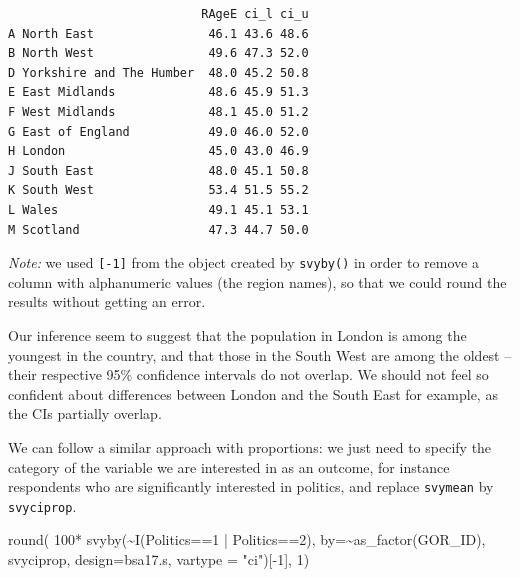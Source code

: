 \documentclass[
  14,
  a4paper,
  DIV=11,
  numbers=noendperiod]{scrartcl}
\newenvironment{Shaded}{\begin{snugshade}}{\end{snugshade}}
\newcommand{\AttributeTok}[1]{\textcolor[rgb]{0.40,0.45,0.13}{#1}}
\newcommand{\DecValTok}[1]{\textcolor[rgb]{0.68,0.00,0.00}{#1}}
\newcommand{\FunctionTok}[1]{\textcolor[rgb]{0.28,0.35,0.67}{#1}}
\newcommand{\NormalTok}[1]{\textcolor[rgb]{0.00,0.23,0.31}{#1}}
\newcommand{\SpecialCharTok}[1]{\textcolor[rgb]{0.37,0.37,0.37}{#1}}
\newcommand{\StringTok}[1]{\textcolor[rgb]{0.13,0.47,0.30}{#1}}
\begin{document}
\begin{verbatim}
                           RAgeE ci_l ci_u
A North East                46.1 43.6 48.6
B North West                49.6 47.3 52.0
D Yorkshire and The Humber  48.0 45.2 50.8
E East Midlands             48.6 45.9 51.3
F West Midlands             48.1 45.0 51.2
G East of England           49.0 46.0 52.0
H London                    45.0 43.0 46.9
J South East                48.0 45.1 50.8
K South West                53.4 51.5 55.2
L Wales                     49.1 45.1 53.1
M Scotland                  47.3 44.7 50.0
\end{verbatim}

\emph{Note:} we used \texttt{{[}-1{]}} from the object created by
\texttt{svyby()} in order to remove a column with alphanumeric values
(the region names), so that we could round the results without getting
an error.

Our inference seem to suggest that the population in London is among the
youngest in the country, and that those in the South West are among the
oldest -- their respective 95\% confidence intervals do not overlap. We
should not feel so confident about differences between London and the
South East for example, as the CIs partially overlap.

We can follow a similar approach with proportions: we just need to
specify the category of the variable we are interested in as an outcome,
for instance respondents who are significantly interested in politics,
and replace \texttt{svymean} by \texttt{svyciprop}.

\begin{Shaded}
\begin{Highlighting}[]
\FunctionTok{round}\NormalTok{(}
      \DecValTok{100}\SpecialCharTok{*}
      \FunctionTok{svyby}\NormalTok{(}\SpecialCharTok{\textasciitilde{}}\FunctionTok{I}\NormalTok{(Politics}\SpecialCharTok{==}\DecValTok{1} \SpecialCharTok{|}\NormalTok{ Politics}\SpecialCharTok{==}\DecValTok{2}\NormalTok{),}
            \AttributeTok{by=}\SpecialCharTok{\textasciitilde{}}\FunctionTok{as\_factor}\NormalTok{(GOR\_ID),}
\NormalTok{            svyciprop,}
            \AttributeTok{design=}\NormalTok{bsa17.s,}
            \AttributeTok{vartype =} \StringTok{"ci"}\NormalTok{)[}\SpecialCharTok{{-}}\DecValTok{1}\NormalTok{],}
            \DecValTok{1}\NormalTok{)}
\end{Highlighting}
\end{Shaded}
\end{document}
